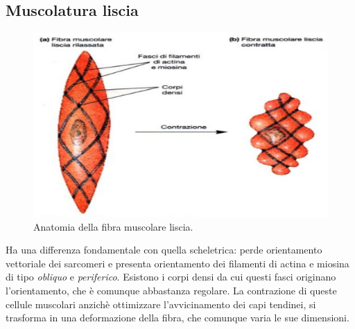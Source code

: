 \documentclass[a4paper,12pt]{article}
\begin{document}
\subsection{Muscolatura liscia}
\begin{figure}[H]
\centering
\includegraphics[scale=0.4]{immagine/liscia.jpg}
\caption{Anatomia della fibra muscolare liscia.}
\end{figure}

Ha una differenza fondamentale con quella scheletrica: perde orientamento vettoriale dei sarcomeri e presenta orientamento dei filamenti di actina e miosina di tipo \emph{obliquo} e \emph{periferico}.
Esistono i corpi densi da cui questi fasci originano l'orientamento, che è comunque abbastanza regolare. La contrazione di queste cellule muscolari anzichè ottimizzare l'avvicinamento dei capi tendinei, si trasforma in una deformazione della fibra, che comunque varia le sue dimensioni.
\end{document}
